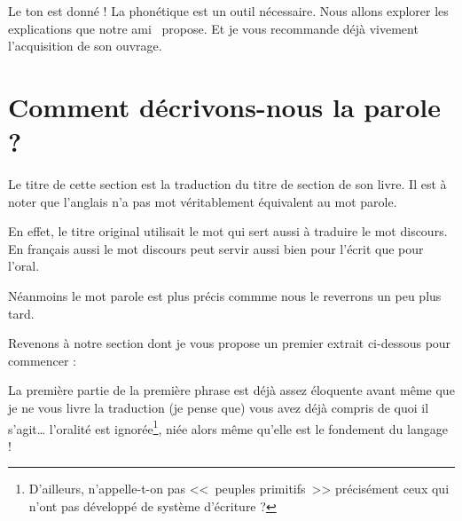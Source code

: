 Le ton est donné ! La phonétique est un outil nécessaire. Nous allons
explorer les explications que notre ami~\cite{lodge} propose. Et je vous
recommande déjà vivement l'acquisition de son ouvrage.

\newpage
\minitoc
\newpage

\section{Comment décrivons-nous la parole ?}

Le titre de cette section est la traduction du titre de section de son
livre. Il est à noter que l'anglais n'a pas mot véritablement
équivalent au mot parole.

En effet, le titre original utilisait le mot  qui sert
aussi à traduire le mot discours. En français aussi le mot discours
peut servir aussi bien pour l'écrit que pour l'oral.

Néanmoins le mot parole est plus précis commme nous le reverrons un
peu plus tard.

Revenons à notre section dont je vous propose un premier extrait ci-dessous pour commencer :

\begin{center}
\begin{mdframed}[style=citestyle, frametitle={Extrait de~\cite{lodge}}]
\end{mdframed}  
\end{center}


La première partie de la première phrase est déjà assez éloquente avant même
que je ne vous livre la traduction (je pense que) vous avez déjà compris de quoi il
s'agit\dots{} l'oralité est ignorée\footnote{D'ailleurs,
  n'appelle-t-on pas <<~peuples primitifs~>> précisément ceux qui
  n'ont pas développé de système d'écriture ?}, niée alors même qu'elle est le
fondement du langage !

